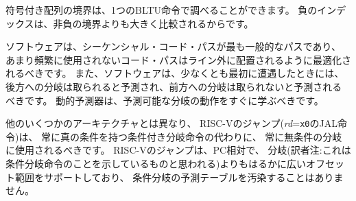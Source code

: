 \begin{commentary}
\begin{comment}
Signed array bounds may be checked with a single BLTU instruction, since
any negative index will compare greater than any nonnegative bound.
\end{comment}
符号付き配列の境界は、1つのBLTU命令で調べることができます。
負のインデックスは、非負の境界よりも大きく比較されるからです。
\end{commentary}

\begin{comment}
Software should be optimized such that the sequential code path is the
most common path, with less-frequently taken code paths placed out of
line.  Software should also assume that backward branches will be
predicted taken and forward branches as not taken, at least the
first time they are encountered.  Dynamic predictors should quickly
learn any predictable branch behavior.
\end{comment}

ソフトウェアは、シーケンシャル・コード・パスが最も一般的なパスであり、
あまり頻繁に使用されないコード・パスはライン外に配置されるように最適化されるべきです。 
また、ソフトウェアは、少なくとも最初に遭遇したときには、
後方への分岐は取られると予測され、前方への分岐は取られないと予測されるべきです。
動的予測器は、予測可能な分岐の動作をすぐに学ぶべきです。

\begin{comment}
Unlike some other architectures, the RISC-V jump (JAL with {\em
  rd}={\tt x0}) instruction should always be used for unconditional
branches instead of a conditional branch instruction with an
always-true condition.  RISC-V jumps are also PC-relative and support
a much wider offset range than branches, and will not pollute
conditional-branch prediction tables.
\end{comment}

他のいくつかのアーキテクチャとは異なり、
RISC-Vのジャンプ({\em rd}={\tt x0}のJAL命令)は、
常に真の条件を持つ条件付き分岐命令の代わりに、
常に無条件の分岐に使用されるべきです。
RISC-Vのジャンプは、PC相対で、
分岐(訳者注:これは条件分岐命令のことを示しているものと思われる)よりもはるかに広いオフセット範囲をサポートしており、
条件分岐の予測テーブルを汚染することはありません。

